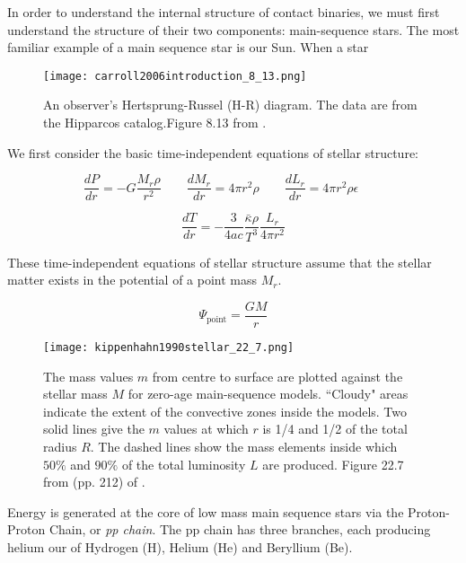 \documentclass[12pt]{article} %
\numberwithin{equation}{section} %
\begin{document}
\citet{carroll2006introduction}

In order to understand the internal structure of contact binaries, we must first understand the structure of their two components: main-sequence stars. The most familiar example of a main sequence star is our Sun. When a star

\begin{figure}[H]
\centering
\texttt{[image: carroll2006introduction\_8\_13.png]}
\caption{An observer's Hertsprung-Russel (H-R) diagram. The data are from the Hipparcos catalog.Figure 8.13 from \citet{carroll2006introduction}.}
\label{fig: carroll2006introduction_8_13}
\end{figure}



We first consider the basic time-independent equations of stellar structure:

\begin{equation}
\frac{dP}{dr} = -G \frac{M_{r} \rho}{r^{2}} \qquad \frac{dM_{r}}{dr} = 4 \pi r^{2} \rho  \qquad \frac{dL_{r}}{dr} = 4 \pi r^{2} \rho \epsilon \qquad 
\end{equation}

\begin{equation}
\frac{dT}{dr} = - \frac{3}{4ac} \frac{\bar{\kappa} \rho}{T^{3}} \frac{L_{r}}{4 \pi r^{2}}
\end{equation}

These time-independent equations of stellar structure assume that the stellar matter exists in the potential of a point mass $M_{r}$. 

\begin{equation}
\Psi_{\text{point}} = \frac{GM}{r}
\end{equation}


\begin{figure}[H]
\centering
\texttt{[image: kippenhahn1990stellar\_22\_7.png]}
\caption{The mass values $m$ from centre to surface are plotted against the stellar mass $M$ for zero-age main-sequence models. ``Cloudy" areas indicate the extent of the convective zones inside the models. Two solid lines give the $m$ values at which $r$ is 1/4 and 1/2 of the total radius $R$. The dashed lines show the mass elements inside which $50\%$ and $90\%$ of the total luminosity $L$ are produced. Figure 22.7 from (pp. 212) of \citet{kippenhahn1990stellar}.}
\label{fig: kippenhahn1990stellar_22_7}
\end{figure}

Energy is generated at the core of low mass main sequence stars via the Proton-Proton Chain, or \emph{pp chain}. The pp chain has three branches, each producing helium our of Hydrogen (H), Helium (He) and Beryllium (Be). 
\end{document}
